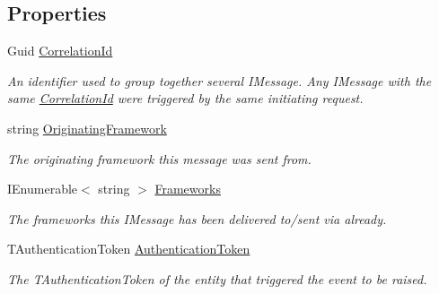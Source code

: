 \subsection*{Properties}
\begin{DoxyCompactItemize}
\item 
Guid \hyperlink{classCqrs_1_1Events_1_1SagaEvent_a3bd1014469c88b763173da28a7d5023c_a3bd1014469c88b763173da28a7d5023c}{Correlation\+Id}
\begin{DoxyCompactList}\small\item\em An identifier used to group together several I\+Message. Any I\+Message with the same \hyperlink{classCqrs_1_1Events_1_1SagaEvent_a3bd1014469c88b763173da28a7d5023c_a3bd1014469c88b763173da28a7d5023c}{Correlation\+Id} were triggered by the same initiating request. \end{DoxyCompactList}\item 
string \hyperlink{classCqrs_1_1Events_1_1SagaEvent_a58fda921f9a06762dcb7eee86390820a_a58fda921f9a06762dcb7eee86390820a}{Originating\+Framework}
\begin{DoxyCompactList}\small\item\em The originating framework this message was sent from. \end{DoxyCompactList}\item 
I\+Enumerable$<$ string $>$ \hyperlink{classCqrs_1_1Events_1_1SagaEvent_a2a52816a942f9d69a3bec20f632b853d_a2a52816a942f9d69a3bec20f632b853d}{Frameworks}
\begin{DoxyCompactList}\small\item\em The frameworks this I\+Message has been delivered to/sent via already. \end{DoxyCompactList}\item 
T\+Authentication\+Token \hyperlink{classCqrs_1_1Events_1_1SagaEvent_a9b5abd2cc59f97f53eaa2c2277733e7f_a9b5abd2cc59f97f53eaa2c2277733e7f}{Authentication\+Token}
\begin{DoxyCompactList}\small\item\em The {\itshape T\+Authentication\+Token}  of the entity that triggered the event to be raised. \end{DoxyCompactList}\item 

\end{DoxyCompactItemize}
